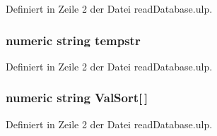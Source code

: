 Definiert in Zeile 2 der Datei read\+Database.\+ulp.

\hypertarget{read_database_8ulp_a7faaad15c15b6161b10321f263c460a3}{}
\subsubsection[{tempstr}]{\setlength{\rightskip}{0pt plus 5cm}numeric string tempstr}\label{read_database_8ulp_a7faaad15c15b6161b10321f263c460a3}


Definiert in Zeile 2 der Datei read\+Database.\+ulp.

\hypertarget{read_database_8ulp_a65aca5f1526cff632f5e2860ccd05422}{}
\subsubsection[{Val\+Sort}]{\setlength{\rightskip}{0pt plus 5cm}numeric string Val\+Sort\mbox{[}$\,$\mbox{]}}\label{read_database_8ulp_a65aca5f1526cff632f5e2860ccd05422}


Definiert in Zeile 2 der Datei read\+Database.\+ulp.

